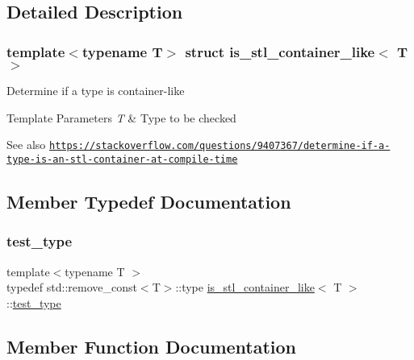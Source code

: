 \subsection{Detailed Description}
\subsubsection*{template$<$typename T$>$\newline
struct is\+\_\+stl\+\_\+container\+\_\+like$<$ T $>$}

Determine if a type is container-\/like 
\begin{DoxyTemplParams}{Template Parameters}
{\em T} & Type to be checked \\
\hline
\end{DoxyTemplParams}
\begin{DoxySeeAlso}{See also}
\href{https://stackoverflow.com/questions/9407367/determine-if-a-type-is-an-stl-container-at-compile-time}{\tt https\+://stackoverflow.\+com/questions/9407367/determine-\/if-\/a-\/type-\/is-\/an-\/stl-\/container-\/at-\/compile-\/time} 
\end{DoxySeeAlso}


\subsection{Member Typedef Documentation}
\mbox{\label{structis__stl__container__like_a4963c0bde8b0f68013b20041308b82e5}} 
\subsubsection{\texorpdfstring{test\+\_\+type}{test\_type}}
{\footnotesize\ttfamily template$<$typename T $>$ \\
typedef std\+::remove\+\_\+const$<$T$>$\+::type \hyperlink{structis__stl__container__like}{is\+\_\+stl\+\_\+container\+\_\+like}$<$ T $>$\+::\hyperlink{structis__stl__container__like_a4963c0bde8b0f68013b20041308b82e5}{test\+\_\+type}}



\subsection{Member Function Documentation}
\mbox{\label{structis__stl__container__like_ada5dd0e7feabf4e4f7fe79db7de5d31d}} 
